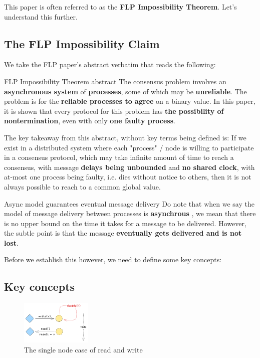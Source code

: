 This paper is often referred to as the \textbf{FLP Impossibility Theorem}. Let's understand this further.

\subsection{The FLP Impossibility Claim}

We take the FLP paper's abstract verbatim that reads the following:

\begin{quotebox}{FLP Impossibility Theorem abstract}
    The consensus problem involves an \textbf{asynchronous system} of \textbf{processes}, some of which may be \textbf{unreliable}. The problem is for the \textbf{reliable processes to agree} on a binary value. In this paper, it is shown that every protocol for this problem has \textbf{the possibility of nontermination}, even with only \textbf{one faulty process}. 
\end{quotebox}

The key takeaway from this abstract, without key terms being defined is: If we exist in a distributed system where each "process" / node is willing to participate in a consensus protocol, which may take infinite amount of time to reach a consensus, with message \textbf{delays being unbounded} and \textbf{no shared clock}, with at-most one process being faulty, i.e. dies without notice to others, then it is not always possible to reach to a common global value.

\begin{alertbox}{Async model guarantees eventual message delivery}
    Do note that when we say the model of message delivery between processes is \textbf{asynchrous} , we mean that there is no upper bound on the time it takes for a message to be delivered. However, the subtle point is that the message \textbf{eventually gets delivered and is not lost}.
\end{alertbox}

Before we establish this however, we need to define some key concepts:

\subsection{Key concepts}

\begin{figure}
    \centering
    \includegraphics[width=0.30\textwidth]{general-problems/assets/flp-single-node-read-write.png}
    \caption{The single node case of read and write}
    \label{fig:flp-single-node-read-write}
\end{figure}

